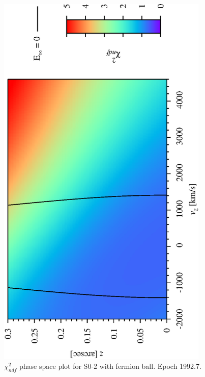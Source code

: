\begin{figure}[!pb]
	\begin{center}
	\includegraphics[angle=-90,width=0.9\textwidth]{eps/so2-FB-run9.eps}
	\caption{$\chi^2_{ndf}$ phase space plot for S0-2 with fermion ball. Epoch 1992.7.}
	\label{fig_so2FBphasespace}
	\end{center}
\end{figure}
